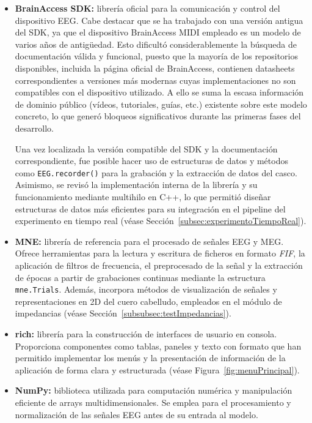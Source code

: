 \begin{itemize}

\item \textbf{BrainAccess SDK:} librería oficial para la comunicación y control del dispositivo EEG. Cabe destacar que se ha trabajado con una versión antigua del SDK, ya que el dispositivo BrainAccess MIDI empleado es un modelo de varios años de antigüedad. Esto dificultó considerablemente la búsqueda de documentación válida y funcional, puesto que la mayoría de los repositorios disponibles, incluida la página oficial de BrainAccess, contienen datasheets correspondientes a versiones más modernas cuyas implementaciones no son compatibles con el dispositivo utilizado. A ello se suma la escasa información de dominio público (vídeos, tutoriales, guías, etc.) existente sobre este modelo concreto, lo que generó bloqueos significativos durante las primeras fases del desarrollo.

Una vez localizada la versión compatible del SDK y la documentación correspondiente, fue posible hacer uso de estructuras de datos y métodos como \texttt{EEG.recorder()} para la grabación y la extracción de datos del casco. Asimismo, se revisó la implementación interna de la librería y su funcionamiento mediante multihilo en C++, lo que permitió diseñar estructuras de datos más eficientes para su integración en el pipeline del experimento en tiempo real (véase Sección~\ref{subsec:experimentoTiempoReal}).

\item \textbf{MNE:} librería de referencia para el procesado de señales EEG y MEG. Ofrece herramientas para la lectura y escritura de ficheros en formato \textit{FIF}, la aplicación de filtros de frecuencia, el preprocesado de la señal y la extracción de épocas a partir de grabaciones continuas mediante la estructura \texttt{mne.Trials}. Además, incorpora métodos de visualización de señales y representaciones en 2D del cuero cabelludo, empleados en el módulo de impedancias (véase Sección~\ref{subsubsec:testImpedancias}).

\item \textbf{rich:} librería para la construcción de interfaces de usuario en consola. Proporciona componentes como tablas, paneles y texto con formato que han permitido implementar los menús y la presentación de información de la aplicación de forma clara y estructurada (véase Figura~\ref{fig:menuPrincipal}).

\item \textbf{NumPy:} biblioteca utilizada para computación numérica y manipulación eficiente de arrays multidimensionales. Se emplea para el procesamiento y normalización de las señales EEG antes de su entrada al modelo.


\end{itemize}
